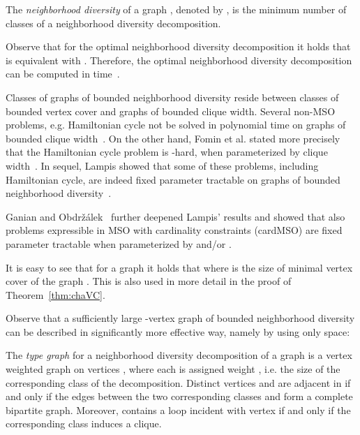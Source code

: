 \documentclass[a4paper,UKenglish]{lipics}
\theoremstyle{plain}
\theoremstyle{definition}
\begin{document}
{\begin{definition}
The \emph{neighborhood diversity} of a graph , denoted by , is the minimum number of classes of a neighborhood diversity decomposition.
\end{definition}

Observe that for the optimal neighborhood diversity decomposition it holds that  is equivalent with 
. 
Therefore, the optimal neighborhood diversity decomposition can be computed in  time~\cite{t:Lampis12}.

Classes of graphs of bounded neighborhood diversity reside between classes of bounded vertex cover and graphs of bounded clique width. Several non-MSO problems, e.g. {\sc Hamiltonian cycle} not be solved in polynomial time on graphs of bounded clique width~\cite{t:Wanke94}. On the other hand, Fomin et al. stated more precisely that the {\sc Hamiltonian cycle} problem is -hard, when parameterized by clique width~\cite{t:FGLS10}.
In sequel, Lampis showed that some of these problems, including {\sc Hamiltonian cycle}, are indeed fixed parameter tractable on graphs of bounded neighborhood diversity~\cite{t:Lampis12}.

Ganian and Obdržálek~\cite{t:GO13} further deepened Lampis' results and showed that also  problems expressible in MSO
with cardinality constraints (cardMSO) are fixed parameter tractable when parameterized by  and/or .

It is easy to see that for a graph  it holds that 
where  is the size of minimal vertex cover of the graph . This is also used in more detail in the proof of 
Theorem~\ref{thm:chaVC}.

Observe that a sufficiently large -vertex graph of bounded neighborhood diversity can be described in significantly more effective way, namely by using only  space:

\begin{definition}
The \emph{type graph}  for a neighborhood diversity decomposition 
of a graph  is a vertex weighted graph on vertices , 
where each  is assigned weight , i.e. the size of the corresponding class of the decomposition. 
Distinct vertices  and  are adjacent in  if and only if the edges between the two corresponding classes  and  form a complete bipartite graph. Moreover,  contains a loop incident with vertex  if and only if the corresponding class  induces a clique. 
\end{definition}

\begin{figure}[ht!]
\end{figure}}
\end{document}
